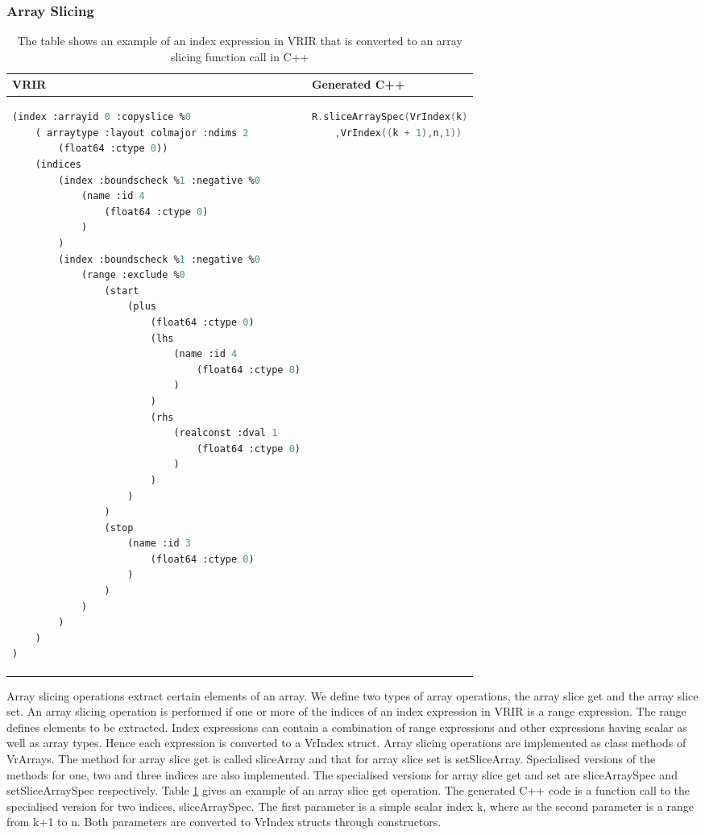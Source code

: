 \subsubsection{Array Slicing}
\label{subsubsec:slicing}
\begin{table}[htbp]
\centering
\begin{tabular}{|l|l|}
\hline

VRIR &  Generated C++ \\
\hline
{
\begin{lstlisting}[language=lisp,frame=none, numbers=none]
(index :arrayid 0 :copyslice %0
	( arraytype :layout colmajor :ndims 2
		(float64 :ctype 0))
	(indices
		(index :boundscheck %1 :negative %0
			(name :id 4
				(float64 :ctype 0)
			)
		)
		(index :boundscheck %1 :negative %0
			(range :exclude %0
				(start
					(plus
						(float64 :ctype 0)
						(lhs
							(name :id 4
								(float64 :ctype 0)
							)
						)
						(rhs
							(realconst :dval 1
								(float64 :ctype 0)
							)
						)
					)
				)
				(stop
					(name :id 3
						(float64 :ctype 0)
					)
				)
			)
		)
	)
)
\end{lstlisting}
}
&
{
\begin{lstlisting}[language=c,frame=none, numbers=none]
R.sliceArraySpec(VrIndex(k)
	,VrIndex((k + 1),n,1))
\end{lstlisting}
} \\
\hline
\end{tabular}
\caption[Array slicing example]{The table shows an example of an index expression in VRIR that is converted to an array slicing function call in C++}
\label{tab:sliceIndex}
\end{table}
Array slicing operations extract certain elements of an array. We define two types of array operations, the array slice get and the array slice set. An array slicing operation is performed if one or more of the indices of an index expression in VRIR is a range expression. The range defines elements to be extracted. Index expressions can contain a combination of range expressions and other expressions having scalar as well as array types. Hence each expression is converted to a VrIndex struct. Array slicing operations are implemented as class methods of VrArrays. The method for array slice get is called sliceArray and that for array slice set is setSliceArray. Specialised versions of the methods for one, two and three indices are also implemented. The specialised versions for array slice get and set are sliceArraySpec and setSliceArraySpec respectively. Table \ref{tab:sliceIndex} gives an example of an array slice get operation. The generated C++ code is a function call to the specialised version for two indices, sliceArraySpec. The first parameter is a simple scalar index k, where as the second parameter is a range from k+1 to n. Both parameters are converted to VrIndex structs through constructors.

